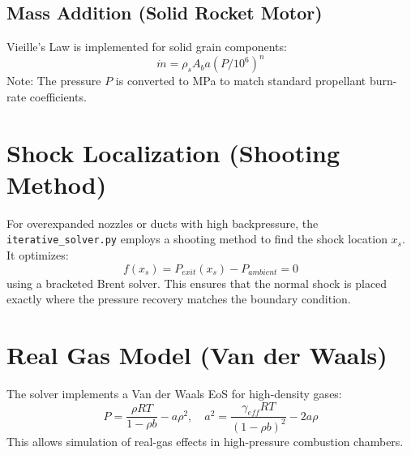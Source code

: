 \documentclass[11pt,a4paper]{article}
\begin{document}
\subsection{Mass Addition (Solid Rocket Motor)}
Vieille's Law is implemented for solid grain components:
\begin{equation}
    \dot{m} = \rho_s A_b a (P/10^6)^n
\end{equation}
Note: The pressure $P$ is converted to MPa to match standard propellant burn-rate coefficients.

\section{Shock Localization (Shooting Method)}
For overexpanded nozzles or ducts with high backpressure, the \texttt{iterative\_solver.py} employs a shooting method to find the shock location $x_s$. It optimizes:
\begin{equation}
    f(x_s) = P_{exit}(x_s) - P_{ambient} = 0
\end{equation}
using a bracketed Brent solver. This ensures that the normal shock is placed exactly where the pressure recovery matches the boundary condition.

\section{Real Gas Model (Van der Waals)}
The solver implements a Van der Waals EoS for high-density gases:
\begin{equation}
    P = \frac{\rho R T}{1 - \rho b} - a \rho^2, \quad a^2 = \frac{\gamma_{eff} R T}{(1-\rho b)^2} - 2 a \rho
\end{equation}
This allows simulation of real-gas effects in high-pressure combustion chambers.
\end{document}
